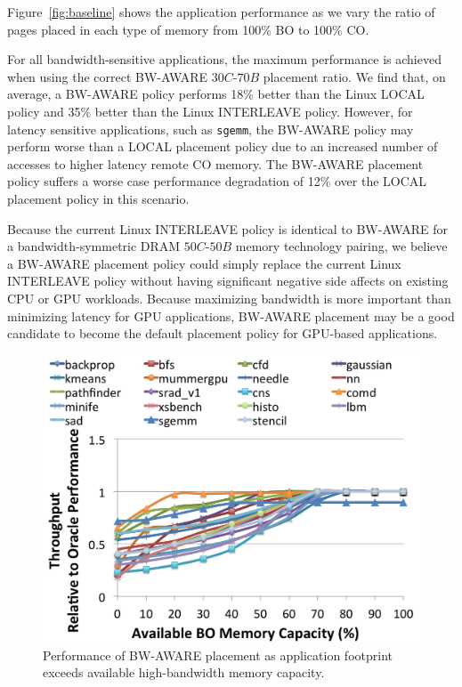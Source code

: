 Figure~\ref{fig:baseline} shows the application performance as we vary the ratio of pages placed in 
each type of memory from 100\% BO to 100\% CO\@. 
{\color{black}
For all bandwidth-sensitive applications, the maximum performance is
achieved when using the correct BW-AWARE $30C$-$70B$ placement ratio.  We
find that, on average, a BW-AWARE policy performs 18\% better than the Linux
LOCAL policy and 35\% better than the Linux INTERLEAVE policy. However, for latency sensitive
applications, such as {\tt sgemm}, the BW-AWARE policy may perform worse than a LOCAL
placement policy due to an increased number of accesses to higher latency remote
CO memory. The BW-AWARE placement policy suffers a worse case performance degradation of
12\% over the LOCAL placement policy in this scenario.


Because the current Linux INTERLEAVE policy is identical to BW-AWARE for a bandwidth-symmetric
DRAM $50C$-$50B$ memory technology pairing, we believe a BW-AWARE placement policy could simply
replace the current Linux INTERLEAVE policy without having significant negative side
affects on existing CPU or GPU workloads.  Because maximizing bandwidth is more important
than minimizing latency for GPU applications, BW-AWARE placement may be a good candidate
to become the default placement policy for GPU-based applications.}

\begin{figure}[t]
    \centering
    \includegraphics[width=0.9\columnwidth]{asplos2015/figures/bwaware-capacity.png}
    \caption{Performance of BW-AWARE placement as application footprint exceeds
available high-bandwidth
    memory capacity.}
    \label{fig:capacityconstrained}
\end{figure}

